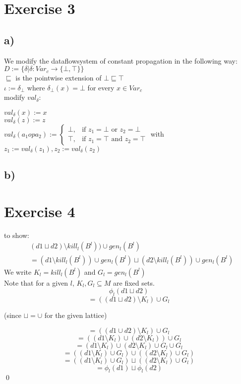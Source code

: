 \documentclass[fleqn,12pt]{article}
\begin{document}
\section*{Exercise 3}
\subsection*{a)}
We modify the dataflowsystem of constant propagation in the following way:
$D := \{ \delta | \delta :Var_c \rightarrow \{ \bot , \top \} \} $\\
$\sqsubseteq$ is the pointwise extension of $\bot \sqsubseteq \top$\\
$\iota := \delta_{\bot} $ where $ \delta_{\bot}(x) = \bot$ for every $x \in Var_c$\\
modify $val_{\delta}$:\\
\begin{center}
$val_{\delta}(x) := x$\\
$val_{\delta}(z) := z$\\
$val_{\delta}(a_1 op a_2) := 
\begin{cases}
    \bot,& \text{if } z_1 = \bot \text{ or } z_2 = \bot\\
    \top,& \text{if } z_1 = \top \text{ and } z_2 = \top
\end{cases}$
with $z_1 := val_{\delta}(z_1), z_2 := val_{\delta}(z_2)$
\end{center}
\subsection*{b)}
\section*{Exercise 4}
to show:\\
\begin{align*}
&(d1 \sqcup d2)\setminus kill_l(B^l)) \cup gen_l(B^l)\\
&= (d1\setminus kill_l(B^l)) \cup gen_l(B^l) \sqcup (d2 \setminus kill_l(B^l)) \cup gen_l(B^l)
\end{align*}
We write $K_l=kill_l(B^l)$ and $G_l=gen_l(B^l)$\\
Note that for a given $l$, $K_l,G_l \subseteq M$ are fixed sets.\\

$$\phi_l(d1 \sqcup d2)$$
$$=((d1 \sqcup d2)\setminus K_l) \cup G_l$$
\begin{center}
(since $\sqcup = \cup$ for the given lattice)
\end{center}
$$=((d1 \cup d2)\setminus K_l) \cup G_l$$
$$=((d1 \setminus K_l) \cup (d2 \setminus K_l) ) \cup G_l$$
$$=(d1 \setminus K_l) \cup (d2 \setminus K_l) \cup G_l \cup G_l$$
$$=((d1 \setminus K_l) \cup G_l) \cup ((d2 \setminus K_l) \cup G_l)$$
$$=((d1 \setminus K_l) \cup G_l) \sqcup ((d2 \setminus K_l) \cup G_l)$$
$$=\phi_l(d1) \sqcup \phi_l(d2)$$
\qed
\end{document}
